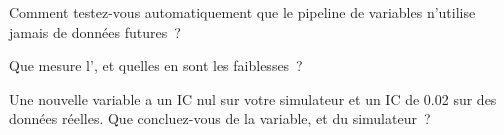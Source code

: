 \begin{interviewq}\label{iq:rs:price-and-volume-features:4}
Comment testez-vous automatiquement que le pipeline de variables n'utilise jamais de données futures~?
\end{interviewq}

\begin{interviewq}\label{iq:rs:price-and-volume-features:5}
Que mesure l', et quelles en sont les faiblesses~?
\end{interviewq}

\begin{interviewq}\label{iq:rs:price-and-volume-features:6}
Une nouvelle variable a un IC nul sur votre simulateur et un IC de 0.02 sur des données réelles. Que concluez-vous de la variable, et du simulateur~?
\end{interviewq}
